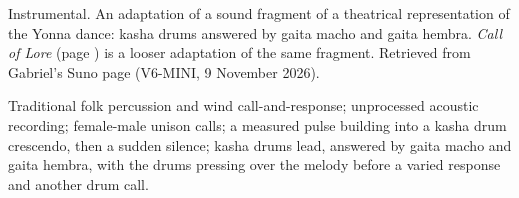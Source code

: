
\label{sec:kasha-call}
\begin{notes}
Instrumental. An adaptation of a sound fragment of a theatrical representation of the Yonna dance: kasha drums answered by gaita macho and gaita hembra. \emph{Call of Lore} (page \pageref{sec:call-of-lore}) is a looser adaptation of the same fragment. Retrieved from Gabriel's Suno page (V6-MINI, 9 November 2026).
\end{notes}
\begin{style}
Traditional folk percussion and wind call-and-response; unprocessed acoustic recording; female-male unison calls; a measured pulse building into a kasha drum crescendo, then a sudden silence; kasha drums lead, answered by gaita macho and gaita hembra, with the drums pressing over the melody before a varied response and another drum call.
\end{style}
\begin{lyrics}
\end{lyrics}

